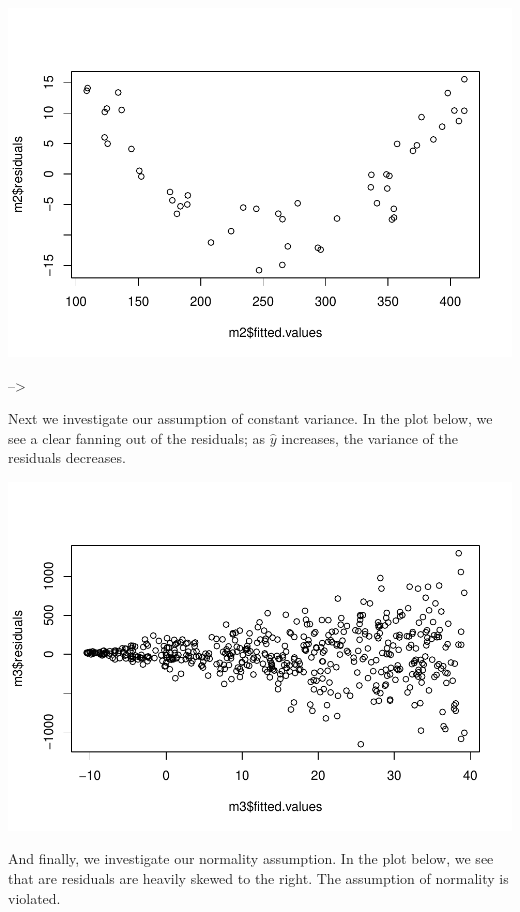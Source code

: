 \documentclass[]{book}
\begin{document}
\includegraphics{MA206supplement_files/figure-latex/unnamed-chunk-12-1.pdf}

--\textgreater{}

Next we investigate our assumption of constant variance. In the plot below, we see a clear fanning out of the residuals; as \(\hat{y}\) increases, the variance of the residuals decreases.

\includegraphics{MA206supplement_files/figure-latex/unnamed-chunk-14-1.pdf}

And finally, we investigate our normality assumption. In the plot below, we see that are residuals are heavily skewed to the right. The assumption of normality is violated.
\end{document}
